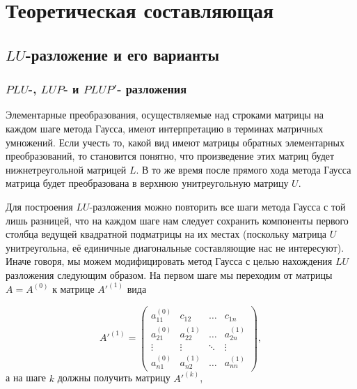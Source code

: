 \section{Теоретическая составляющая}

\subsection{$LU$-разложение и его варианты}
\subsubsection{$PLU$-, $LUP$- и $PLUP'$- разложения}

Элементарные преобразования, осуществляемые над строками матрицы на каждом шаге метода Гаусса, имеют интерпретацию в терминах матричных умножений. Если учесть то, какой вид имеют матрицы обратных элементарных преобразований, то становится понятно, что произведение этих матриц будет нижнетреугольной матрицей $L$. В то же время после прямого хода метода Гаусса матрица будет преобразована в верхнюю унитреугольную матрицу $U$.

Для построения $LU$-разложения можно повторить все шаги метода Гаусса с той лишь разницей, что на каждом шаге нам следует сохранить компоненты первого столбца ведущей квадратной подматрицы на их местах (поскольку матрица $U$ унитреугольна, её единичные диагональные составляющие нас не интересуют). Иначе говоря, мы можем модифицировать метод Гаусса с целью нахождения $LU$ разложения следующим образом. На первом шаге мы переходим от матрицы $A = A^{(0)}$ к матрице $A'^{(1)}$ вида

\[
A'^{ (1) } = 
	\begin{pmatrix}
		a_{11}^{ (0) } & c_{12}			& \hdots & c_{1n}			\\
		a_{21}^{ (0) } & a_{22}^{ (1) } & \hdots & a_{2n}^{ (1) }	\\
		\vdots		   & \vdots			& \ddots & \vdots			\\
		a_{n1}^{ (0) } & a_{n2}^{ (1) } & \hdots & a_{nn}^{ (1) } 	
	\end{pmatrix},
\]
а на шаге $k$ должны получить матрицу $A'^{ (k) }$, 

